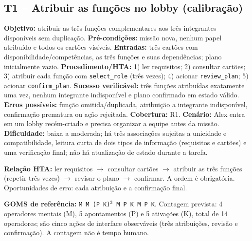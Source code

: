 \documentclass[conference]{IEEEtran}
\begin{document}
\subsection{T1 -- Atribuir as funções no lobby (calibração)}
\textbf{Objetivo:} atribuir as três funções complementares aos três integrantes disponíveis sem duplicação. \textbf{Pré-condições:} missão nova, nenhum papel atribuído e todos os cartões visíveis. \textbf{Entradas:} três cartões com disponibilidade/competências, as três funções e suas dependências; plano inicialmente vazio. \textbf{Procedimento/HTA:} 1) ler requisitos; 2) consultar cartões; 3) atribuir cada função com \texttt{select\_role} (três vezes); 4) acionar \texttt{review\_plan}; 5) acionar \texttt{confirm\_plan}. \textbf{Sucesso verificável:} três funções atribuídas exatamente uma vez, nenhum integrante indisponível e plano confirmado em estado válido. \textbf{Erros possíveis:} função omitida/duplicada, atribuição a integrante indisponível, confirmação prematura ou ação rejeitada. \textbf{Cobertura:} R1. \textbf{Cenário:} Alex entra em um lobby recém-criado e precisa organizar a equipe antes da missão. \textbf{Dificuldade:} baixa a moderada; há três associações sujeitas a unicidade e compatibilidade, leitura curta de dois tipos de informação (requisitos e cartões) e uma verificação final; não há atualização de estado durante a tarefa.

\textbf{Relação HTA:} ler requisitos $\rightarrow$ consultar cartões $\rightarrow$ atribuir as três funções (repetir três vezes) $\rightarrow$ revisar o plano $\rightarrow$ confirmar. A ordem é obrigatória. Oportunidades de erro: cada atribuição e a confirmação final.

\textbf{GOMS de referência:} \texttt{M M (P K)$^3$ M P K M P K}. Contagem prevista: 4 operadores mentais (M), 5 apontamentos (P) e 5 ativações (K), total de 14 operadores; são cinco ações de interface observáveis (três atribuições, revisão e confirmação). A contagem não é tempo humano.
\end{document}
